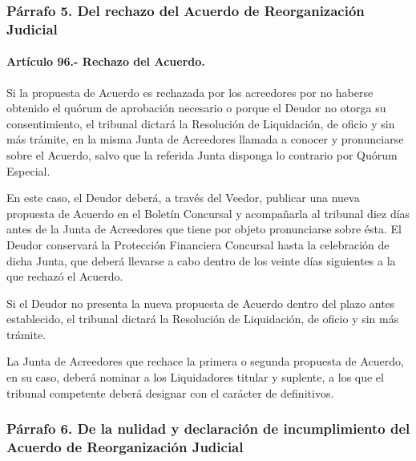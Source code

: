 \documentclass[
]{book}
\begin{document}
\hypertarget{puxe1rrafo-5.-del-rechazo-del-acuerdo-de-reorganizaciuxf3n-judicial}{%
\subsubsection*{Párrafo 5. Del rechazo del Acuerdo de Reorganización Judicial}\label{puxe1rrafo-5.-del-rechazo-del-acuerdo-de-reorganizaciuxf3n-judicial}}

\hypertarget{artuxedculo-96.--rechazo-del-acuerdo.}{%
\paragraph*{Artículo 96.- Rechazo del Acuerdo.}\label{artuxedculo-96.--rechazo-del-acuerdo.}}

Si la propuesta de Acuerdo es rechazada por los acreedores por no haberse obtenido el quórum de aprobación necesario o porque el Deudor no otorga su consentimiento, el tribunal dictará la Resolución de Liquidación, de oficio y sin más trámite, en la misma Junta de Acreedores llamada a conocer y pronunciarse sobre el Acuerdo, salvo que la referida Junta disponga lo contrario por Quórum Especial.

En este caso, el Deudor deberá, a través del Veedor, publicar una nueva propuesta de Acuerdo en el Boletín Concursal y acompañarla al tribunal diez días antes de la Junta de Acreedores que tiene por objeto pronunciarse sobre ésta. El Deudor conservará la Protección Financiera Concursal hasta la celebración de dicha Junta, que deberá llevarse a cabo dentro de los veinte días siguientes a la que rechazó el Acuerdo.

Si el Deudor no presenta la nueva propuesta de Acuerdo dentro del plazo antes establecido, el tribunal dictará la Resolución de Liquidación, de oficio y sin más trámite.

La Junta de Acreedores que rechace la primera o segunda propuesta de Acuerdo, en su caso, deberá nominar a los Liquidadores titular y suplente, a los que el tribunal competente deberá designar con el carácter de definitivos.

\hypertarget{puxe1rrafo-6.-de-la-nulidad-y-declaraciuxf3n-de-incumplimiento-del-acuerdo-de-reorganizaciuxf3n-judicial}{%
\subsubsection*{Párrafo 6. De la nulidad y declaración de incumplimiento del Acuerdo de Reorganización Judicial}\label{puxe1rrafo-6.-de-la-nulidad-y-declaraciuxf3n-de-incumplimiento-del-acuerdo-de-reorganizaciuxf3n-judicial}}
\end{document}
